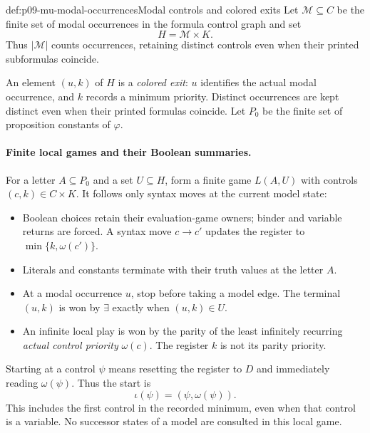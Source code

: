 \begin{hbconvention}{def:p09-mu-modal-occurrences}{Modal controls and colored exits}
Let \(\mathcal M\subseteq C\) be the finite set of modal
occurrences in the formula control graph and set
\[
 H=\mathcal M\times K.
\]
Thus \(\lvert\mathcal M\rvert\) counts occurrences, retaining distinct
controls even when their printed subformulas coincide.
\end{hbconvention}
An element \((u,k)\) of \(H\) is a \emph{colored
exit}: \(u\) identifies the actual modal occurrence,
and \(k\) records a minimum priority. Distinct
occurrences are kept distinct even when their
printed formulas coincide. Let \(P_0\) be the
finite set of proposition constants of \(\varphi\).

\paragraph{Finite local games and their Boolean summaries.}
For a letter \(A\subseteq P_0\) and a set
\(U\subseteq H\), form a finite game \(L(A,U)\)
with controls \((c,k)\in C\times K\).
It follows only syntax moves at the current
model state:
\begin{itemize}
\item Boolean choices retain their evaluation-game
owners; binder and variable returns are forced.
A syntax move \(c\to c'\) updates the register to
\(\min\{k,\omega(c')\}\).
\item Literals and constants terminate with
their truth values at the letter \(A\).
\item At a modal occurrence \(u\), stop before
taking a model edge. The terminal \((u,k)\)
is won by \(\exists\) exactly when \((u,k)\in U\).
\item An infinite local play is won by the
parity of the least infinitely recurring
\emph{actual control priority} \(\omega(c)\).
The register \(k\) is not its parity priority.
\end{itemize}
Starting at a control \(\psi\) means resetting
the register to \(D\) and immediately reading
\(\omega(\psi)\). Thus the start is
\[
 \iota(\psi)=(\psi,\omega(\psi)).
\]
This includes the first control in the recorded
minimum, even when that control is a variable.
No successor states of a model are consulted
in this local game.

